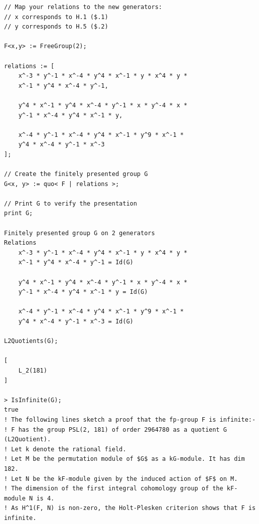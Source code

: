 \documentclass{article}
\begin{document}
\begin{verbatim}
// Map your relations to the new generators:
// x corresponds to H.1 ($.1)
// y corresponds to H.5 ($.2)

F<x,y> := FreeGroup(2);

relations := [
    x^-3 * y^-1 * x^-4 * y^4 * x^-1 * y * x^4 * y *
    x^-1 * y^4 * x^-4 * y^-1,

    y^4 * x^-1 * y^4 * x^-4 * y^-1 * x * y^-4 * x *
    y^-1 * x^-4 * y^4 * x^-1 * y,

    x^-4 * y^-1 * x^-4 * y^4 * x^-1 * y^9 * x^-1 *
    y^4 * x^-4 * y^-1 * x^-3
];

// Create the finitely presented group G
G<x, y> := quo< F | relations >;

// Print G to verify the presentation
print G;

Finitely presented group G on 2 generators
Relations
    x^-3 * y^-1 * x^-4 * y^4 * x^-1 * y * x^4 * y *
    x^-1 * y^4 * x^-4 * y^-1 = Id(G)

    y^4 * x^-1 * y^4 * x^-4 * y^-1 * x * y^-4 * x *
    y^-1 * x^-4 * y^4 * x^-1 * y = Id(G)

    x^-4 * y^-1 * x^-4 * y^4 * x^-1 * y^9 * x^-1 *
    y^4 * x^-4 * y^-1 * x^-3 = Id(G)

L2Quotients(G);

[
    L_2(181)
]

> IsInfinite(G);
true 
! The following lines sketch a proof that the fp-group F is infinite:-
! F has the group PSL(2, 181) of order 2964780 as a quotient G (L2Quotient).
! Let k denote the rational field.
! Let M be the permutation module of $G$ as a kG-module. It has dim 182.
! Let N be the kF-module given by the induced action of $F$ on M.
! The dimension of the first integral cohomology group of the kF-module N is 4.
! As H^1(F, N) is non-zero, the Holt-Plesken criterion shows that F is infinite.


\end{verbatim}
\end{document}
